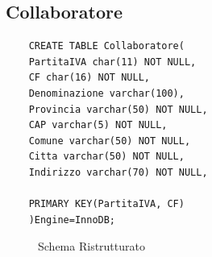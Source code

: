 \documentclass{elegantbook}
\begin{document}
\subsection{Collaboratore}
\begin{verbatim}
	CREATE TABLE Collaboratore(
	PartitaIVA char(11) NOT NULL,
	CF char(16) NOT NULL,
	Denominazione varchar(100),
	Provincia varchar(50) NOT NULL,
	CAP varchar(5) NOT NULL,
	Comune varchar(50) NOT NULL,
	Citta varchar(50) NOT NULL,
	Indirizzo varchar(70) NOT NULL,
	
	PRIMARY KEY(PartitaIVA, CF)
	)Engine=InnoDB;
\end{verbatim}
\begin{figure}[H]
	\centering
	\caption{Schema Ristrutturato}
\end{figure}
\end{document}
